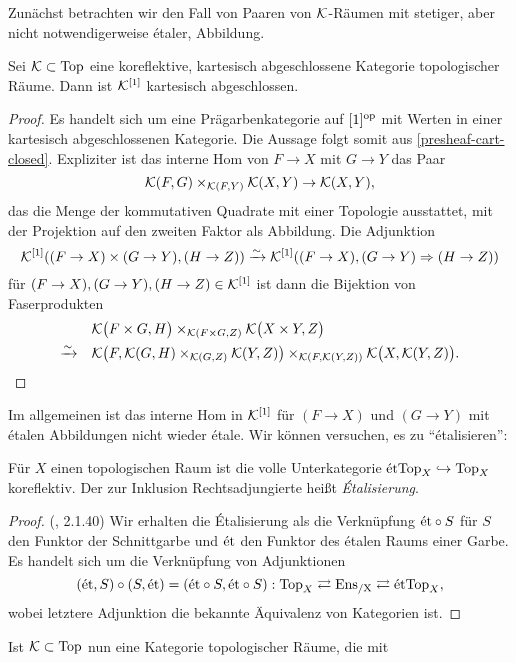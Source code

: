 Zunächst betrachten wir den Fall von Paaren von $\mathcal{K}$-Räumen mit
stetiger, aber nicht notwendigerweise étaler, Abbildung.
\begin{lemma} \label{k-arrow-cart-closed}
  Sei $\mathcal{K} \subset \operatorname{Top}$ eine koreflektive, kartesisch abgeschlossene
  Kategorie topologischer Räume. Dann ist $\mathcal{K}^{[1]}$ kartesisch
  abgeschlossen.
\end{lemma}
\begin{proof}
  Es handelt sich um eine Prägarbenkategorie auf $[1]^\mathrm{op}$ mit Werten in
  einer kartesisch abgeschlossenen Kategorie. Die Aussage folgt somit
  aus \ref{presheaf-cart-closed}. Expliziter ist das interne Hom von
  $F \to X$ mit $G \to Y$ das Paar
  \[ \mathcal{K}(F, G) \times_{\mathcal{K}(F, Y)} \mathcal{K}(X, Y) \to \mathcal{K}(X, Y),
  \]
  das die Menge der kommutativen Quadrate mit einer Topologie
  ausstattet, mit der Projektion auf den zweiten Faktor als
  Abbildung. Die Adjunktion
  \[ \mathcal{K}^{[1]}((F \to X) \times (G \to Y), (H \to Z))
  \xrightarrow[]{\sim} \mathcal{K}^{[1]}((F \to X), (G \to Y) \Rightarrow (H \to Z))
  \]
  für $(F \to X), (G \to Y), (H \to Z) \in \mathcal{K}^{[1]}$ ist dann die
  Bijektion von Faserprodukten
  \begin{align*}
    &\mathcal{K}\big( F \times G, H\big) \times_{\mathcal{K}(F \times G, Z)} \mathcal{K}\big( X \times Y, Z\big) \\
    \xrightarrow[]{\sim} \quad &\mathcal{K}\big( F, \mathcal{K}(G, H) \times_{\mathcal{K}(G, Z)} \mathcal{K}(Y, Z)\big)
    \times_{\mathcal{K}(F, \mathcal{K}(Y, Z))} \mathcal{K}\big(X, \mathcal{K}(Y, Z)\big).
  \end{align*}
\end{proof}
Im allgemeinen ist das interne Hom in $\mathcal{K}^{[1]}$ für $(F \to X)$ und
$(G \to Y)$ mit étalen Abbildungen nicht wieder étale. Wir können
versuchen, es zu ``étalisieren'':
\begin{lemma}[\cite{TG}, 2.1.40]
  Für $X$ einen topologischen Raum ist die volle Unterkategorie
  $\mathrm{\acute{e}tTop}_X \hookrightarrow \operatorname{Top}_X$ koreflektiv. Der zur Inklusion
  Rechtsadjungierte heißt \emph{Étalisierung}.
\end{lemma}
\begin{proof} (\cite{TG}, 2.1.40)
  Wir erhalten die Étalisierung als die Verknüpfung $\mathrm{\acute{e}t} \circ S$ für
  $S$ den Funktor der Schnittgarbe und $\mathrm{\acute{e}t}$ den Funktor des étalen
  Raums einer Garbe. Es handelt sich um die Verknüpfung von
  Adjunktionen
  \[(\mathrm{\acute{e}t}, S) \circ (S, \mathrm{\acute{e}t}) = (\mathrm{\acute{e}t} \circ S, \mathrm{\acute{e}t} \circ S):
  \operatorname{Top}_X \rightleftarrows \operatorname{Ens_{/X}} \rightleftarrows \mathrm{\acute{e}tTop}_X,
  \]
  wobei letztere Adjunktion die bekannte Äquivalenz von Kategorien
  ist.
\end{proof}
Ist $\mathcal{K} \subset \operatorname{Top}$ nun eine Kategorie topologischer Räume, die mit
